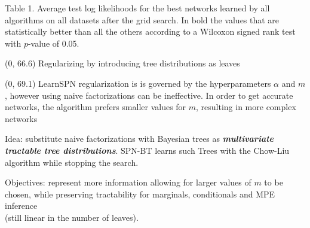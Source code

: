 \documentclass[final]{beamer}
\begin{document}
\begin{frame}{}
\begin{textblock}{25.2}
\begin{table}[!htbp]
      \end{table}
      \begin{center}
        \begin{minipage}[t]{0.9\linewidth}
          \tiny\flushleft
          Table 1. Average test
          log likelihoods for the best networks learned by all
          algorithms on all datasets after the grid search. In bold
          the values that are statistically better than all the others
          according to a Wilcoxon signed rank test with $p$-value of 0.05.
        \end{minipage}
      \end{center}



      
      \end{textblock}


        
  \begin{textblock}{80}(0, 66.6)
    Regularizing by introducing tree distributions as leaves
  \end{textblock}
  
  \begin{textblock}{25.2}(0, 69.1)
    \footnotesize
    LearnSPN regularization is is governed by the hyperparameters $\alpha$ and $m$,
    however using naive factorizations can be ineffective. In order to
    get accurate networks, the algorithm prefers smaller values for
    $m$, resulting in more complex networks\par\bigskip

    Idea: substitute naive factorizations with Bayesian trees as
    \emph{\textbf{multivariate tractable tree
        distributions}}. \textsf{SPN-BT} learns such \textsf{T}rees
    with the Chow-Liu algorithm while stopping the search.\par\bigskip

    \begin{minipage}[t]{0.6\linewidth}
        \flushleft
        Objectives: represent more information allowing for larger
        values of $m$ to be chosen, while preserving tractability for marginals,
        conditionals and MPE inference\\(still linear in the number of leaves).
      \end{minipage}%
  \end{textblock}


\end{frame}
\end{document}
